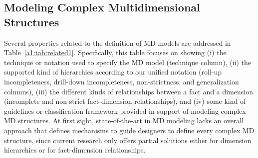 \subsection{Modeling Complex Multidimensional Structures}
Several properties related to the definition of MD models are
addressed in Table~\ref{a1:tab:related1}. Specifically, this table
focuses on showing (i) the technique or notation used to specify the
MD model (technique column), (ii) the supported kind of hierarchies
according to our unified notation (roll-up incompleteness,
drill-down incompleteness, non-strictness, and generalization
columns), (iii) the different kinds of relationships between a fact
and a dimension (incomplete and non-strict fact-dimension
relationships), and (iv) some kind of guidelines or classification
framework provided in support of modeling complex MD structures. At
first sight, state-of-the-art in MD modeling lacks an overall
approach that defines mechanisms to guide designers to define every
complex MD structure, since current research only offers partial
solutions either for dimension hierarchies or for fact-dimension
relationships.


